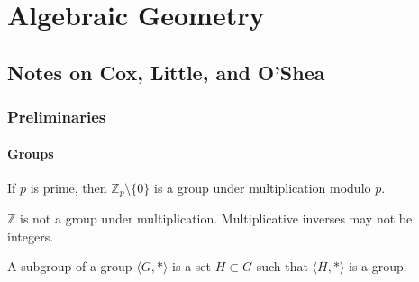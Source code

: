\chapter{Algebraic Geometry}
    \section{Notes on Cox, Little, and O'Shea}
        \subsection{Preliminaries}
            \subsubsection{Groups}
                \begin{theorem}
                    If $p$ is prime, then
                    $\mathbb{Z}_p\setminus \{0\}$ is a group
                    under multiplication modulo $p$.
                \end{theorem}
                $\mathbb{Z}$ is not a group under multiplication.
                Multiplicative inverses may not be integers.
                \begin{definition}
                    A subgroup of a group $\langle G,*\rangle$ is
                    a set $H\subset G$ such that $\langle H,*\rangle$
                    is a group.
                \end{definition}
